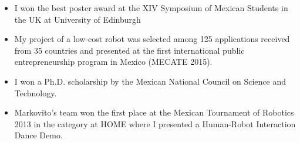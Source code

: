 \documentclass{mycv}
\begin{document}
\begin{itemize}
\item I won the best poster award at the XIV Symposium of Mexican Students in the UK at University of Edinburgh \href{https://github.com/mxochicale/symposiummx/tree/master/2016}{\faExternalLink*}  

\item My project of a low-cost robot was selected among 125 applications received from 35 countries and presented at the first international public entrepreneurship program in Mexico (MECATE 2015). \href{http://let-emprendimientopublico.mx/en/portfolio_category/mecate-primera-generacion-en/}{\faExternalLink*} \href{https://www.youtube.com/watch?v=VjVGnwD422g}{\faYoutube} 

\item I won a Ph.D. scholarship by the Mexican National Council on Science and Technology. 

\item Markovito's team  won the first place at the Mexican Tournament of Robotics 2013 in the category at HOME where I presented a Human-Robot Interaction Dance Demo. \href{https://www.youtube.com/watch?v=Kw-lZam_qZI}{\faYoutube} 

\end{itemize}

\end{document}
